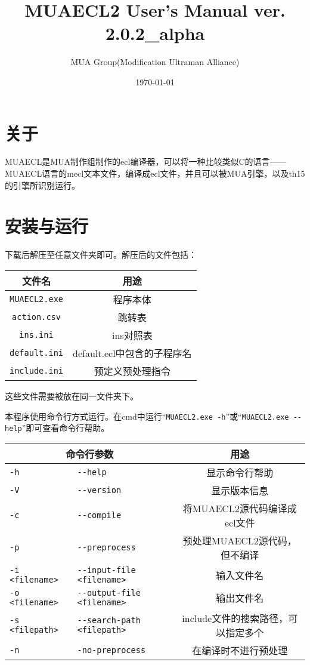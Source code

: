 \documentclass[UTF8]{ctexart}
\author{MUA Group(Modification Ultraman Alliance)}
\title{MUAECL2 User's Manual  ver. 2.0.2\_alpha}
\date{\today}
\begin{document}
\maketitle
\tableofcontents
\clearpage

\section{关于}

MUAECL是MUA制作组制作的ecl编译器，可以将一种比较类似C的语言——MUAECL语言的mecl文本文件，编译成ecl文件，并且可以被MUA引擎，以及th15的引擎所识别运行。

\section{安装与运行}

下载后解压至任意文件夹即可。解压后的文件包括：

\begin{table}[H]
	\centering
	\begin{tabular}{c|c}
		\hline
		文件名 & 用途 \\\hline
		\verb|MUAECL2.exe| & 程序本体 \\\hline
		\verb|action.csv| & 跳转表 \\\hline
		\verb|ins.ini| & ins对照表 \\\hline
		\verb|default.ini| & default.ecl中包含的子程序名 \\\hline
		\verb|include.ini| & 预定义预处理指令 \\\hline
	\end{tabular}
\end{table}

这些文件需要被放在同一文件夹下。

本程序使用命令行方式运行。在cmd中运行``\verb|MUAECL2.exe -h|''或``\verb|MUAECL2.exe --help|''即可查看命令行帮助。

\begin{table}[H]
	\centering
	\begin{tabular}{l|l|c}
		\hline
		\multicolumn{2}{c|}{命令行参数} & 用途 \\\hline
		\verb|-h| & \verb|--help| & 显示命令行帮助 \\\hline
		\verb|-V| & \verb|--version| & 显示版本信息 \\\hline
		\verb|-c| & \verb|--compile| & 将MUAECL2源代码编译成ecl文件 \\\hline
		\verb|-p| & \verb|--preprocess| & 预处理MUAECL2源代码，但不编译 \\\hline
		\verb|-i <filename>| & \verb|--input-file <filename>| & 输入文件名 \\\hline
		\verb|-o <filename>| & \verb|--output-file <filename>| & 输出文件名 \\\hline
		\verb|-s <filepath>| & \verb|--search-path <filepath>| & include文件的搜索路径，可以指定多个 \\\hline
		\verb|-n| & \verb|-no-preprocess| & 在编译时不进行预处理 \\\hline
	\end{tabular}
\end{table}
\end{document}
